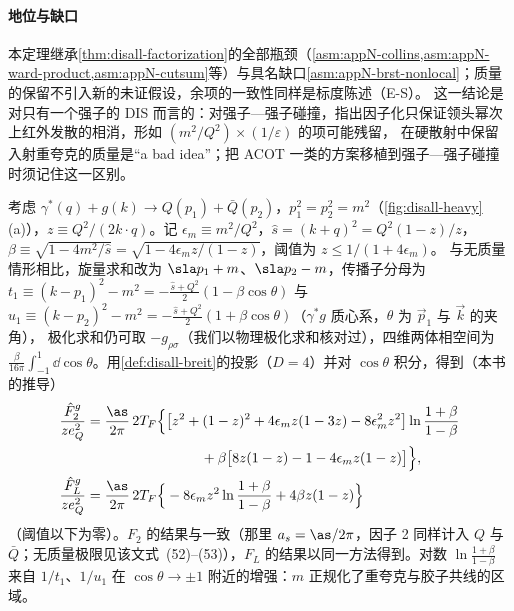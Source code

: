 \paragraph{地位与缺口}
本定理继承\cref{thm:disall-factorization}的全部瓶颈（\cref{asm:appN-collins,asm:appN-ward-product,asm:appN-cutsum}等）与具名缺口\cref{asm:appN-brst-nonlocal}；质量的保留不引入新的未证假设，余项的一致性同样是标度陈述（E-S）。
这一结论是对只有一个强子的 DIS 而言的：对强子—强子碰撞，\cite[第~14.6~节，第~569--570~页]{Collins2011}指出因子化只保证领头幂次上红外发散的相消，形如 $(m^2/Q^2)\times(1/\varepsilon)$ 的项可能残留，
在硬散射中保留入射重夸克的质量是“a bad idea”；把 ACOT 一类的方案移植到强子—强子碰撞时须记住这一区别。

\begin{example}\label{ex:disall-heavy-lo}
考虑 $\gamma^*(q)+g(k)\to Q(p_1)+\bar Q(p_2)$，$p_1^2=p_2^2=m^2$（\cref{fig:disall-heavy}(a)），$z\equiv Q^2/(2k\cdot q)$。记 $\epsilon_m\equiv m^2/Q^2$，$\hat s=(k+q)^2=Q^2(1-z)/z$，$\beta\equiv\sqrt{1-4m^2/\hat s}=\sqrt{1-4\epsilon_mz/(1-z)}$，阈值为 $z\le1/(1+4\epsilon_m)$。
与无质量情形相比，旋量求和改为 $\sla p_1+m$、$\sla p_2-m$，传播子分母为 $t_1\equiv(k-p_1)^2-m^2=-\frac{\hat s+Q^2}2(1-\beta\cos\theta)$ 与 $u_1\equiv(k-p_2)^2-m^2=-\frac{\hat s+Q^2}2(1+\beta\cos\theta)$（$\gamma^*g$ 质心系，$\theta$ 为 $\vec p_1$ 与 $\vec k$ 的夹角），
极化求和仍可取 $-g_{\rho\sigma}$（我们以物理极化求和核对过），四维两体相空间为 $\frac\beta{16\pi}\int_{-1}^1\dd\cos\theta$。用\cref{def:disall-breit}的投影（$D=4$）并对 $\cos\theta$ 积分，得到（本书的推导）
\begin{equation}\label{eq:disall-heavy-lo}
\begin{aligned}
\frac{\hat F^g_2}{ze_Q^2}&=\frac{\as}{2\pi}\,2T_F\Big\{\big[z^2+(1-z)^2+4\epsilon_mz(1-3z)-8\epsilon_m^2z^2\big]\ln\frac{1+\beta}{1-\beta}\\
&\hspace{8.2em}+\beta\big[8z(1-z)-1-4\epsilon_mz(1-z)\big]\Big\},\\
\frac{\hat F^g_L}{ze_Q^2}&=\frac{\as}{2\pi}\,2T_F\Big\{-8\epsilon_mz^2\ln\frac{1+\beta}{1-\beta}+4\beta z(1-z)\Big\}
\end{aligned}
\end{equation}
（阈值以下为零）。$F_2$ 的结果与\cite[式~(49)--(51)]{Forte:2010ta}一致（那里 $a_s=\as/2\pi$，因子 2 同样计入 $Q$ 与 $\bar Q$；无质量极限见该文式~(52)--(53)），$F_L$ 的结果以同一方法得到。对数 $\ln\frac{1+\beta}{1-\beta}$ 来自 $1/t_1$、$1/u_1$ 在 $\cos\theta\to\pm1$ 附近的增强：$m$ 正规化了重夸克与胶子共线的区域。

\end{example}
